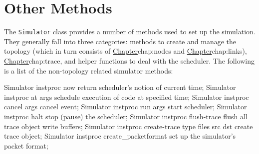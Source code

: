 \section{Other Methods}
\label{sec:other}

The {\tt Simulator} class provides a number of methods used
to set up the simulation.
They generally fall into three categories:
methods to create and manage the topology 
(which in turn consists of
\href{managing the nodes}{Chapter}{chap:nodes} and
\href{managing the links}{Chapter}{chap:links}),
\href{methods to perform tracing}{Chapter}{chap:trace},
and helper functions to deal with the scheduler.
The following is a list of the non-topology related simulator methods:
\begin{program}
Simulator instproc now {} \; return scheduler's notion of current time;
Simulator instproc at args \; schedule execution of code at specified time;
Simulator instproc cancel args \; cancel event;
Simulator instproc run args \; start scheduler;
Simulator instproc halt {} \; stop (pause) the scheduler;
Simulator instproc flush-trace {} \; flush all trace object write buffers;
Simulator instproc create-trace { type files src dst } \; create trace object;
Simulator instproc create_packetformat \; set up the simulator's packet format;
\end{program}

\endinput
